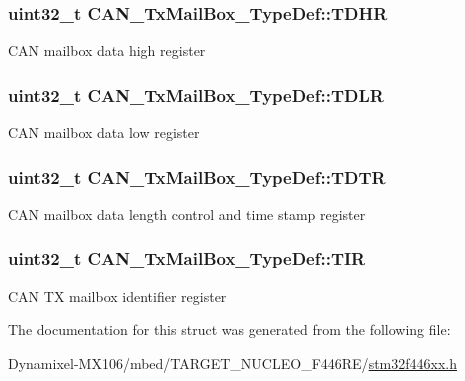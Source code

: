 \subsubsection[{\texorpdfstring{T\+D\+HR}{TDHR}}]{ uint32\+\_\+t C\+A\+N\+\_\+\+Tx\+Mail\+Box\+\_\+\+Type\+Def\+::\+T\+D\+HR}\hypertarget{struct_c_a_n___tx_mail_box___type_def_a98c6bcd7c9bae378ebf83fd9f5b59020}{}\label{struct_c_a_n___tx_mail_box___type_def_a98c6bcd7c9bae378ebf83fd9f5b59020}
C\+AN mailbox data high register 
\subsubsection[{\texorpdfstring{T\+D\+LR}{TDLR}}]{ uint32\+\_\+t C\+A\+N\+\_\+\+Tx\+Mail\+Box\+\_\+\+Type\+Def\+::\+T\+D\+LR}\hypertarget{struct_c_a_n___tx_mail_box___type_def_a408c96501b1cc8bd527432736d132a39}{}\label{struct_c_a_n___tx_mail_box___type_def_a408c96501b1cc8bd527432736d132a39}
C\+AN mailbox data low register 
\subsubsection[{\texorpdfstring{T\+D\+TR}{TDTR}}]{ uint32\+\_\+t C\+A\+N\+\_\+\+Tx\+Mail\+Box\+\_\+\+Type\+Def\+::\+T\+D\+TR}\hypertarget{struct_c_a_n___tx_mail_box___type_def_a2351cb865d064cf75f61642aaa887f76}{}\label{struct_c_a_n___tx_mail_box___type_def_a2351cb865d064cf75f61642aaa887f76}
C\+AN mailbox data length control and time stamp register 
\subsubsection[{\texorpdfstring{T\+IR}{TIR}}]{ uint32\+\_\+t C\+A\+N\+\_\+\+Tx\+Mail\+Box\+\_\+\+Type\+Def\+::\+T\+IR}\hypertarget{struct_c_a_n___tx_mail_box___type_def_a22f525c909de2dcec1d4093fe1d562b8}{}\label{struct_c_a_n___tx_mail_box___type_def_a22f525c909de2dcec1d4093fe1d562b8}
C\+AN TX mailbox identifier register 

The documentation for this struct was generated from the following file\+:\begin{DoxyCompactItemize}
\item 
Dynamixel-\/\+M\+X106/mbed/\+T\+A\+R\+G\+E\+T\+\_\+\+N\+U\+C\+L\+E\+O\+\_\+\+F446\+R\+E/\hyperlink{stm32f446xx_8h}{stm32f446xx.\+h}\end{DoxyCompactItemize}
